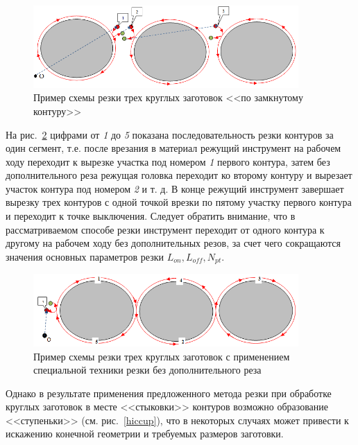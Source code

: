 \documentclass[11pt,twoside,openany]{report}
\begin{document}
\begin{figure}[h]
  \begin{center}
  \includegraphics[width=0.9\textwidth]{3-3.png}
  \caption{
    Пример схемы резки трех круглых заготовок
    <<по замкнутому контуру>>
    }
  \label{3-3}
  \end{center}
\end{figure}

На рис.~\ref{3-1}
цифрами от {\it 1} до {\it 5} показана последовательность
резки контуров за один сегмент,
т.е. после врезания в материал режущий инструмент
на рабочем ходу переходит к вырезке участка
под номером {\it 1} первого контура,
затем без дополнительного реза режущая головка
переходит ко второму контуру и вырезает участок
контура под номером {\it 2} и т. д.
В конце режущий инструмент завершает
вырезку трех контуров с одной точкой
врезки по пятому участку первого контура и
переходит к точке выключения.
Следует обратить внимание, что в рассматриваемом
способе резки инструмент переходит от одного контура к
другому на рабочем ходу без дополнительных резов,
за счет чего сокращаются значения основных параметров резки
$L_{on}, L_{off}, N_{pt}$.

\begin{figure}[h]
  \begin{center}
  \includegraphics[width=0.9\textwidth]{3-1.png}
  \caption{Пример схемы резки трех круглых заготовок с применением специальной техники резки без дополнительного реза}
  \label{3-1}
  \end{center}
\end{figure}

Однако в результате применения предложенного метода
резки при обработке круглых заготовок в месте <<стыковки>>
контуров возможно образование <<ступеньки>>
(см. рис.~\ref{hiccup}),
что в некоторых случаях может привести к
искажению конечной геометрии и требуемых размеров заготовки.
\end{document}
